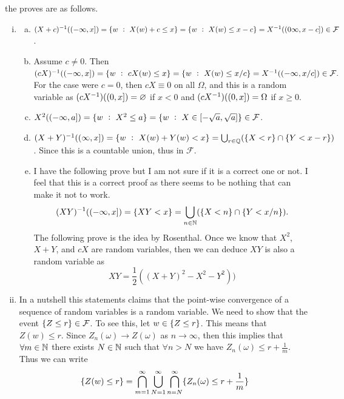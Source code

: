 \begin{solution}
	the proves are as follows.
	\begin{enumerate}[(i)]
		\item \begin{enumerate}[(a)]
			\item $ \inv{(X+c)}((-\infty,x]) = \set{w\ :\ X(w)+c \leq x} = \set{w\ :\ X(w)\leq x-c} = \inv{X}((0\-\infty,x-c]) \in \mathcal{F} $.
			\item Assume $ c\neq 0 $. Then $ \inv{(cX)}((-\infty, x]) = \set{w\ :\ cX(w) \leq x} = \set{w\ :\ X(w) \leq x/c}  = \inv{X}((-\infty,x/c]) \in \mathcal{F}. $ For the case were $ c=0 $, then $ cX \equiv 0 $ on all $ \Omega $, and this is a random variable as $ (cX^{-1})((0,x]) = \varnothing$ if $ x < 0 $ and $ (cX^{-1})((0,x]) = \Omega $ if $ x\geq 0 $.
			\item $ X^2((-\infty,a]) = \{w\ :\ X^2 \leq a\} = \{w\ :\ X \in [-\sqrt{a},\sqrt{a}]\} \in \mathcal{F} $.
			\item $ \inv{(X+Y)}((\infty,x]) = \set{w\ :\ X(w)+Y(w) < x} = \bigcup_{r\in \Q}(\set{X < r} \cap \set{Y<x-r}) $. Since this is a countable union, thus in $ \mathcal{F} $.
			\item I have the following prove but I am not sure if it is a correct one or not. I feel that this is a correct proof as there seems to be nothing that can make it not to work.
			\[ (XY)^{-1}((-\infty,x]) = \{XY < x\} = \bigcup_{n\in\mathbb{N}} (\{X<n\} \cap \{Y<x/n\}). \]
			The following prove is the idea by Rosenthal. Once we know that $ X^2 $, $ X+Y $, and $ cX $ are random variables, then we can deduce $ XY $ is also a random variable as
			\[ XY = \frac{1}{2}((X+Y)^2 - X^2 - Y^2)) \]
		\end{enumerate}
		\item In a nutshell this statements claims that the point-wise convergence of a sequence of random variables is a random variable. We need to show that the event $ \{Z\leq r\} \in \mathcal{F} $. To see this, let $ w \in \{Z\leq r\} $. This means that $ Z(w) \leq r $. Since $ Z_n(\omega) \to Z(\omega) $ as $ n\to \infty $, then this implies that $ \forall m \in \mathbb{N} $ there exists $ N \in \mathbb{N} $ such that $ \forall n > N $ we have $ Z_n(\omega) \leq r + \frac{1}{m} $. Thus we can write
		\[ \{Z(w) \leq r\} = \bigcap_{m=1}^{\infty} \bigcup_{N=1}^{\infty} \bigcap_{n=N}^{\infty} \{ Z_n(\omega) \leq r + \frac{1}{m}\} \]
	\end{enumerate}
\end{solution}

